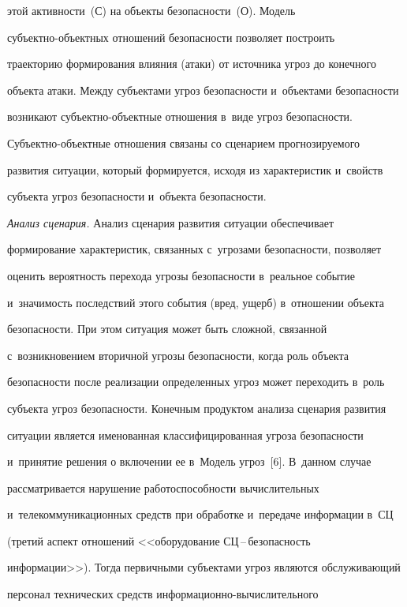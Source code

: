 этой ак\-тив\-ности~(С) на объекты безопас\-ности~(О). Модель  

субъ\-ект\-но-объек\-тных отношений безопас\-ности позволяет построить 

траекторию формирования влияния (атаки) от источника угроз до конечного 

объекта атаки. Между субъектами угроз без\-опас\-ности и~объектами безопас\-ности 

возникают субъ\-ект\-но-объект\-ные отношения в~виде угроз безопас\-ности. 

Субъект\-но-объект\-ные отношения связаны со сценарием прогнозируемого 

развития ситуации, который формируется, исходя из характеристик и~свойств 

субъекта угроз безопас\-ности и~объекта безопас\-ности.

  

  \textit{Анализ сценария.} Анализ сценария развития ситуации обеспечивает 

формирование характеристик, связанных с~угрозами безопасности, позволяет 

оценить вероятность перехода угрозы без\-опас\-ности в~реальное событие 

и~значимость последствий этого события (вред, ущерб) в~отношении объекта 

безопасности. При этом ситуация может быть сложной, связанной 

с~возникновением вторичной угрозы без\-опас\-ности, когда роль объекта 

безопасности после реализации определенных угроз может переходить в~роль 

субъекта угроз без\-опас\-ности. Конечным продуктом анализа сценария развития 

ситуации является именованная классифицированная угроза без\-опас\-ности 

и~принятие решения о включении ее в~Модель угроз~[6]. В~данном случае 

рассматривается нарушение ра\-бо\-то\-спо\-соб\-ности вычислительных 

и~телекоммуникационных средств при обработке и~передаче информации в~СЦ 

(третий аспект отношений <<оборудование СЦ\,--\,без\-опас\-ность 

информации>>). Тогда первичными субъектами угроз являются об\-слу\-жи\-ва\-ющий 

персонал технических средств ин\-фор\-ма\-ци\-он\-но-вы\-чис\-ли\-тель\-но\-го 

